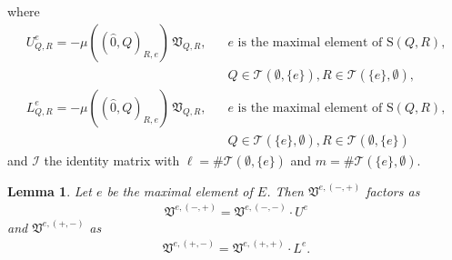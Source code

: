 \documentclass[12pt]{amsart}
\def\Var{{\mathfrak V}}
\def\Tscr{{\mathcal T}}
\theoremstyle{plain}
\newtheorem{Lemma}{Lemma}
\numberwithin{Lemma}{\DefaultNumberTheoremWithin}
\numberwithin{Claim}{\DefaultNumberTheoremWithin}
\numberwithin{Theorem}{\DefaultNumberTheoremWithin}
\numberwithin{Corollary}{\DefaultNumberTheoremWithin}
\numberwithin{Proposition}{\DefaultNumberTheoremWithin}
\numberwithin{Conjecture}{\DefaultNumberTheoremWithin}
\numberwithin{Situation}{\DefaultNumberTheoremWithin}
\numberwithin{Note}{\DefaultNumberTheoremWithin}
\theoremstyle{definition}
\numberwithin{Definition}{\DefaultNumberTheoremWithin}
\theoremstyle{definition}
\numberwithin{Question}{\DefaultNumberTheoremWithin}
\theoremstyle{definition}
\numberwithin{Problem}{\DefaultNumberTheoremWithin}
\theoremstyle{remark} \newtheorem{Remark}{Remark}
\numberwithin{Remark}{\DefaultNumberTheoremWithin}
\theoremstyle{remark}
\numberwithin{Example}{\DefaultNumberTheoremWithin}
\numberwithin{Case}{Lemma}
\numberwithin{Step}{Lemma}
\begin{document}
where 
\begin{align*}
U^e_{Q,R} = -\mu((\hat{0},Q)_{R,e}) \, \Var_{Q,R},\;\;\;  &e \text{ is the maximal element of S}(Q,R), \\  &Q \in \Tscr(\emptyset,\{e\}), R \in \Tscr(\{e\},\emptyset) , \\
L^e_{Q,R} = -\mu((\hat{0},Q)_{R,e})\, \Var_{Q,R},\;\;\;  &e \text{ is the maximal element of S}(Q,R), \\ & Q \in \Tscr(\{e\},\emptyset), R \in \Tscr(\emptyset, \{e\})
\end{align*}
and $\mathcal{I}$ the identity matrix with $\ell=\#\Tscr(\emptyset,\{e\})$ and $m = \# \Tscr(\{e\},\emptyset)$. 


\begin{Lemma}\label{lem:fac1}
   Let $e$ be the maximal element of $E$. Then 
   $\Var^{e,(-,+)}$ factors as
   \begin{align}\label{equ:minus}
      \Var^{e,(-,+)} = \Var^{e,(-,-)} \cdot U^e
   \end{align}
   and $\Var^{e,(+,-)}$ as
   \begin{align}\label{equ:plus}
      \Var^{e,(+,-)} = \Var^{e,(+,+)} \cdot L^e.
   \end{align}
\end{Lemma}
\end{document}
